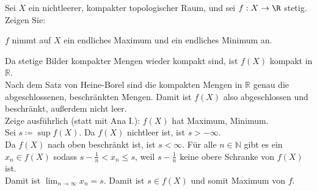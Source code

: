 \begin{assignment}
  Sei \( X \) ein nichtleerer, kompakter topologischer Raum, und sei \( f: X \to \R \) stetig. Zeigen Sie:
  
  \( f \) nimmt auf \( X \) ein endliches Maximum und ein endliches Minimum an.
\end{assignment}
\begin{solution}
  Da stetige Bilder kompakter Mengen wieder kompakt sind, ist \( f(X) \) kompakt in \( \mathbb{R} \). \\
  Nach dem Satz von Heine-Borel sind die kompakten Mengen in \( \mathbb{R} \) genau die abgeschlossenen, beschränkten Mengen. Damit ist \( f(X) \) also abgeschlossen und beschränkt, außerdem nicht leer. \\
  Zeige ausführlich (statt mit Ana I.): \( f(X) \) hat Maximum, Minimum. \\
  Sei \( s \coloneqq \sup f(X) \). Da \( f(X) \) nichtleer ist, ist \( s > - \infty \). \\
  Da \( f(X) \) nach oben beschränkt ist, ist \( s < \infty \).
  Für alle \( n \in \mathbb{N} \) gibt es ein \( x_n \in f(X) \) sodass \( s - \frac{1}{n} < x_n \leq s \), weil \( s - \frac{1}{n} \) keine obere Schranke von \( f(X) \) ist. \\
  Damit ist \( \lim_{n \rightarrow \infty} x_n = s \). Damit ist \( s \in f(X) \) und somit Maximum von \( f \).
\end{solution}

